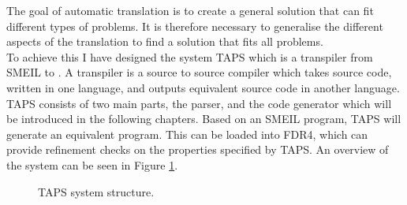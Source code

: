 The goal of automatic translation is to create a general solution that can fit different types of problems. It is therefore necessary to generalise the different aspects of the translation to find a solution that fits all problems.\\

To achieve this I have designed the system TAPS which is a transpiler from SMEIL to \cspm{}. A transpiler is a source to source compiler which takes source code, written in one language, and outputs equivalent source code in another language.\\

TAPS consists of two main parts, the parser, and the code generator which will be introduced in the following chapters. Based on an SMEIL program, TAPS will generate an equivalent \cspm{} program. This can be loaded into FDR4, which can provide refinement checks on the properties specified by TAPS. An overview of the system can be seen in Figure \ref{fig:TAPS_network}.
\begin{figure}[!ht]
  \centering
  \caption{TAPS system structure.}
  \label{fig:TAPS_network}
\end{figure}

